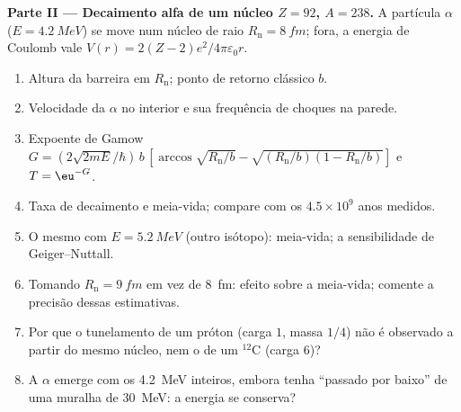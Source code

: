 \begin{problem}
\textbf{Parte II --- Decaimento alfa de um núcleo $Z = 92$, $A = 238$.}
A partícula $\alpha$ ($E = \qty{4.2}{MeV}$) se move num núcleo de raio
$R_{\text{n}} = \qty{8}{fm}$; fora, a energia de Coulomb vale $V(r) =
2(Z - 2)e^2/4\pi\varepsilon_0r$.
\begin{enumerate}[resume]
  \item Altura da barreira em $R_{\text{n}}$; ponto de retorno clássico
        $b$.
  \item Velocidade da $\alpha$ no interior e sua frequência de choques na
        parede.
  \item Expoente de Gamow $G = (2\sqrt{2mE}/\hbar)\,b\,[\arccos\sqrt{R_{\text{n}}/b}
        - \sqrt{(R_{\text{n}}/b)(1 - R_{\text{n}}/b)}]$ e $T = \eu^{-G}$.
  \item Taxa de decaimento e meia-vida; compare com os $4.5 \times
        10^9$ anos medidos.
  \item O mesmo com $E = \qty{5.2}{MeV}$ (outro isótopo): meia-vida;
        a sensibilidade de Geiger--Nuttall.
  \item Tomando $R_{\text{n}} = \qty{9}{fm}$ em vez de \qty{8}{fm}: efeito sobre
        a meia-vida; comente a precisão dessas estimativas.
  \item Por que o tunelamento de um próton (carga $1$, massa $1/4$)
        não é observado a partir do mesmo núcleo, nem o de um $^{12}$C
        (carga $6$)?
  \item A $\alpha$ emerge com os \qty{4.2}{MeV} inteiros, embora tenha
        ``passado por baixo'' de uma muralha de \qty{30}{MeV}: a energia se conserva?
\end{enumerate}


\end{problem}

